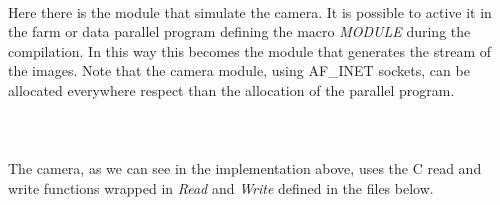 
\ \\
Here there is the module that simulate the camera. It is possible to active it in the farm or data parallel program defining the macro \textit{MODULE} during the compilation. In this way this becomes the module that generates the stream of the images. Note that the camera module, using AF\_INET sockets, can be allocated everywhere respect than the allocation of the parallel program.
\ \\

\ \\
\ \\

\ \\
The camera, as we can see in the implementation above, uses the C read and write functions wrapped in \textit{Read} and \textit{Write} defined in the files below.
\ \\

\ \\
\ \\

\ \\